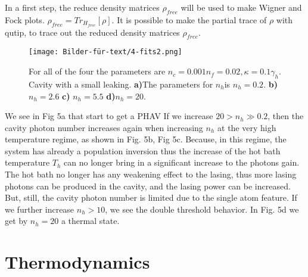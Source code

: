 \documentclass[12pt,a4paper]{article}
\begin{document}
\newpage
In a first step, the reduce density matrices $\rho_{free}$ will be used to make Wigner and Fock plots.
$\rho_{free}=Tr_{H_{free}}[\rho]$.
It is possible to make the partial trace of $\rho$ with qutip, to trace out the reduced density matrices $\rho_{free}$. 
\begin{figure}[h!]
\centering
\texttt{[image: Bilder-für-text/4-fits2.png]}
\caption{For all of the four the parameters are $n_c=0.001 n_f=0.02,\kappa=0.1\gamma_h$. Cavity with a small leaking.
\textbf{a)}The parameters for $n_h$is $n_h=0.2 $.
\textbf{b)}$ n_h=2.6$ 
\textbf{c)} $ n_h=5.5$ 
\textbf{d)}$ n_h=20$. 
}
\end{figure}
\newpage
We see in Fig 5a that start to get a PHAV
If we increase  $20>n_h \gg 0.2 $,
then the cavity photon number increases again when increasing $n_h$ at the very
high temperature regime, as shown in Fig. 5b, Fig 5c. Because,
in this regime, the system has already a population inversion
thus the increase of the hot bath temperature $T_h$
can no longer bring in a significant increase to the photons gain.
The hot bath no longer has
any weakening effect to the lasing, thus more lasing photons
can be produced in the cavity, and the lasing power can be
increased. But, still, the cavity photon number is limited due to
the single atom feature.
If we further increase  $n_h >10$, we see the double threshold behavior. 
In Fig. 5d we get by $n_h=20$ a thermal state.
\section{Thermodynamics}
\end{document}

